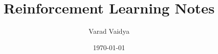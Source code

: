 \documentclass[working,a4paper]{article}
\title{Reinforcement Learning Notes}
\author{Varad Vaidya}
\date{\today}
\begin{document}
  \createintro

  
  \clearpage
  
  \clearpage
  
  \clearpage
  
  \clearpage
  
  \clearpage
  
  \clearpage
  
  \clearpage
  

  
\end{document}
